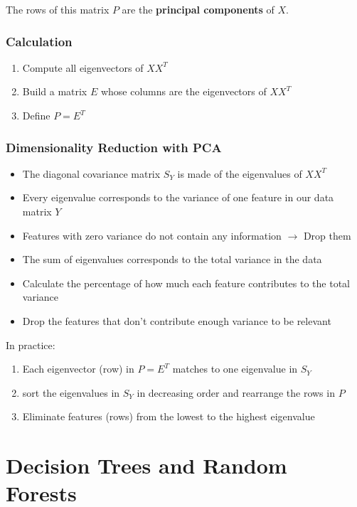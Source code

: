 \documentclass[11pt]{article}
\begin{document}
The rows of this matrix $P$ are the \textbf{principal components} of $X$.

\subsubsection{Calculation}

\begin{enumerate}
    \item Compute all eigenvectors of $XX^T$
    \item Build a matrix $E$ whose columns are the eigenvectors of $XX^T$
    \item Define $P = E^T$
\end{enumerate}

\subsubsection{Dimensionality Reduction with PCA}
\begin{itemize}
    \item The diagonal covariance matrix $S_Y$ is made of the eigenvalues of $XX^T$
    \item Every eigenvalue corresponds to the variance of one feature in our data matrix $Y$
    \item Features with zero variance do not contain any information $\rightarrow$ Drop them
    \item The sum of eigenvalues corresponds to the total variance in the data
    \item Calculate the percentage of how much each feature contributes to the total variance
    \item Drop the features that don't contribute enough variance to be relevant
\end{itemize}

In practice:

\begin{enumerate}
    \item Each eigenvector (row) in $P = E^T$ matches to one eigenvalue in $S_Y$
    \item sort the eigenvalues in $S_Y$ in decreasing order and rearrange the rows in $P$
    \item Eliminate features (rows) from the lowest to the highest eigenvalue
\end{enumerate}

\section{Decision Trees and Random Forests}
\end{document}
